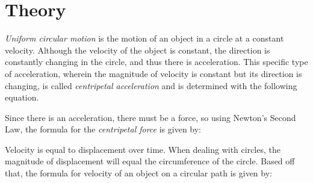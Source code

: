 \section{Theory}
\vspace{-0.5cm}
\singlespacing

\textit{Uniform circular motion} is the motion of an object in a circle at a constant velocity. Although the velocity of the object is constant, the direction is constantly changing in the circle, and thus there is acceleration. This specific type of acceleration, wherein the magnitude of velocity is constant but its direction is changing, is called \textit{centripetal acceleration} and is determined with the following equation.

{}

Since there is an acceleration, there must be a force, so using Newton's Second Law, the formula for the \textit{centripetal force} is given by:

{}

Velocity is equal to displacement over time. When dealing with circles, the magnitude of displacement will equal the circumference of the circle. Based off that, the formula for velocity of an object on a circular path is given by:


{}

\newpage
